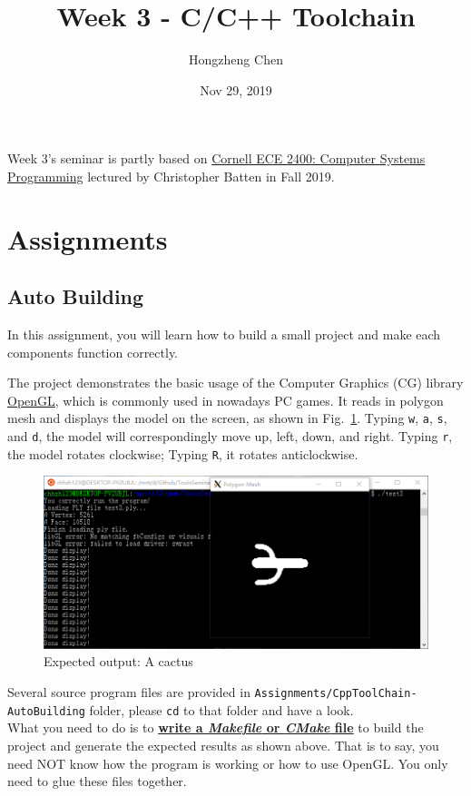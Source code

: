 \documentclass[english]{../TexTemplate/thesis}
\title{Week 3 - C/C++ Toolchain}
\author{Hongzheng Chen}
\date{Nov 29, 2019}
\begin{document}
\maketitle

Week 3's seminar is partly based on \href{https://cornell-ece2400.github.io/ece2400-docs/ece2400-sec2-c-basics/}{Cornell ECE 2400: Computer Systems Programming} lectured by Christopher Batten in Fall 2019.

\section{Assignments}
\subsection{Auto Building}
In this assignment, you will learn how to build a small project and make each components function correctly.

The project demonstrates the basic usage of the Computer Graphics (CG) library \href{https://www.opengl.org}{OpenGL}, which is commonly used in nowadays PC games.
It reads in polygon mesh and displays the model on the screen, as shown in Fig.~\ref{fig:cactus}.
Typing \verb'w', \verb'a', \verb's', and \verb'd', the model will correspondingly move up, left, down, and right.
Typing \verb'r', the model rotates clockwise; Typing \verb'R', it rotates anticlockwise.
\begin{figure}[H]
\centering
\includegraphics[width=\linewidth]{fig/assignments/autobuild_result.png}
\caption{Expected output: A cactus}
\label{fig:cactus}
\end{figure}

Several source program files are provided in \verb'Assignments/CppToolChain-AutoBuilding' folder, please \verb'cd' to that folder and have a look.\\
What you need to do is to \underline{\textbf{write a \emph{Makefile} or \emph{CMake} file}} to build the project and generate the expected results as shown above.
That is to say, you need NOT know how the program is working or how to use OpenGL.
You only need to glue these files together.
\end{document}
